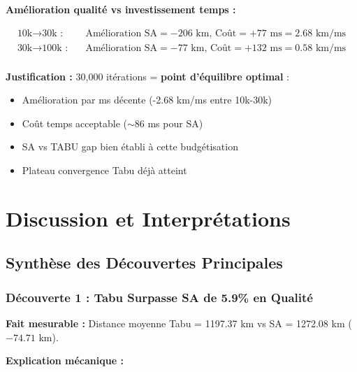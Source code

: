 \documentclass[12pt,a4paper,twoside]{report}
\begin{document}
\textbf{Amélioration qualité vs investissement temps :}

\begin{align}
    \text{10k} \to \text{30k :}  & \quad \text{Amélioration SA} = -206 \text{ km, Coût} = +77 \text{ ms} = 2.68 \text{ km/ms} \\
    \text{30k} \to \text{100k :} & \quad \text{Amélioration SA} = -77 \text{ km, Coût} = +132 \text{ ms} = 0.58 \text{ km/ms} \\
\end{align}

\textbf{Justification :} 30,000 itérations = \textbf{point d'équilibre optimal} :
\begin{itemize}
    \item Amélioration par ms décente (-2.68 km/ms entre 10k-30k)
    \item Coût temps acceptable ($\sim 86$ ms pour SA)
    \item SA vs TABU gap bien établi à cette budgétisation
    \item Plateau convergence Tabu déjà atteint
\end{itemize}

\chapter{Discussion et Interprétations}

\section{Synthèse des Découvertes Principales}

\subsection{Découverte 1 : Tabu Surpasse SA de 5.9\% en Qualité}

\textbf{Fait mesurable :} Distance moyenne Tabu = 1197.37 km vs SA = 1272.08 km ($-74.71$ km).

\textbf{Explication mécanique :}
\end{document}
